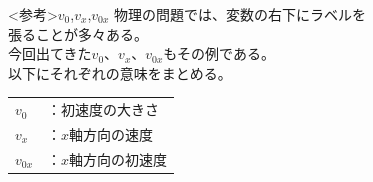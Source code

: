\documentclass[11pt,twoside]{article}
\begin{document}
	\begin{minipage}[t]{0.44\linewidth}
	\end{minipage}
	\hfill
	\begin{minipage}[t]{0.52\linewidth}
			\begin{itembox}[l]{<参考>$v_0$,$v_x$,$v_{0x}$}
			物理の問題では、変数の右下にラベルを\\張ることが多々ある。\\
			今回出てきた$v_0$、$v_x$、$v_{0x}$もその例である。\\
			以下にそれぞれの意味をまとめる。
			\begin{center}
				\begin{tabular}{ll}
					$v_0$    & ：初速度の大きさ \\
					$v_x$    & ：$x$軸方向の速度 \\
					$v_{0x}$ & ：$x$軸方向の初速度 \\
				\end{tabular}
			\end{center}
		\end{itembox}
	\end{minipage}
	\clearpage
\end{document}
